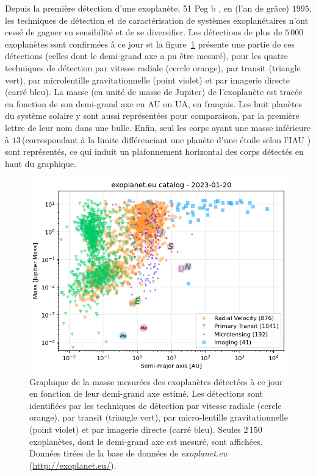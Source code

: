 Depuis la première détection d'une exoplanète, 51 Peg b \citep{mayor1995}, en (l'an de grâce) $1995$, les techniques de détection et de caractérisation de systèmes exoplanétaires n'ont cessé de gagner en sensibilité et de se diversifier. Les détections de plus de $5\,000$ exoplanètes sont confirmées à ce jour et la figure~\ref{fig:ExoplanetDetection} présente une partie de ces détections (celles dont le demi-grand axe a pu être mesuré), pour les quatre techniques de détection par vitesse radiale (cercle orange), par transit (triangle vert), par microlentille gravitationnelle (point violet) et par imagerie directe (carré bleu). La masse (en unité de masse de Jupiter) de l'exoplanète est tracée en fonction de son demi-grand axe en \ac{AU} ou \ac{UA}, en français. Les huit planètes du système solaire y sont aussi représentées pour comparaison, par la première lettre de leur nom dans une bulle. Enfin, seul les corps ayant une masse inférieure à $13 \,$\MJ (correspondant à la limite différenciant une planète d'une étoile selon l'\ac{IAU} \citep{lecavelierdesetangs2022}) sont représentés, ce qui induit un plafonnement horizontal des corps détectés en haut du graphique.

\begin{figure}[ht!]
    \centering
    \includegraphics[width=\figwidth]{Figure_Chap1/20230120_exoplanet_diagram_RV_PT_ML_IM.png}
    \caption[Graphique des exoplanètes détectées à ce jour suivant les quatre techniques de détection principales.]{Graphique de la masse mesurées des exoplanètes détectées à ce jour en fonction de leur demi-grand axe estimé. Les détections sont identifiées par les techniques de détection par vitesse radiale (cercle orange), par transit (triangle vert), par micro-lentille gravitationnelle (point violet) et par imagerie directe (carré bleu). Seules $2\,150$ exoplanètes, dont le demi-grand axe est mesuré, sont affichées. Données tirées de la base de données de \textit{exoplanet.eu} (\url{http://exoplanet.eu/}).}
    \label{fig:ExoplanetDetection}
\end{figure}

